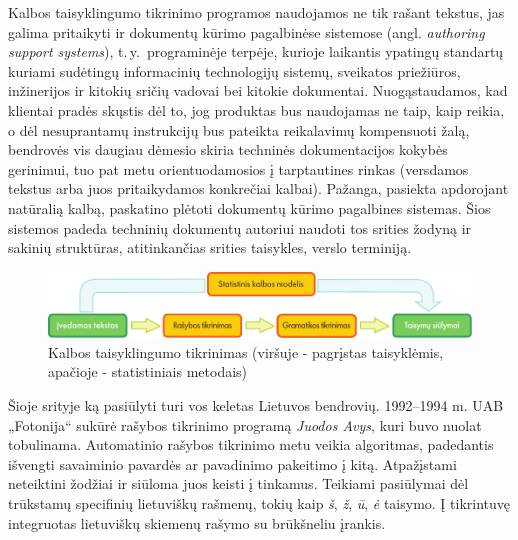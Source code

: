 \begin{multicols}{2}

Kalbos taisyklingumo tikrinimo programos naudojamos ne tik rašant tekstus, jas galima pritaikyti ir dokumentų kūrimo pagalbinėse sistemose (angl. \textit{authoring support systems}), t.\,y.~programinėje terpėje, kurioje laikantis ypatingų standartų kuriami sudėtingų informacinių technologijų sistemų, sveikatos priežiūros, inžinerijos ir kitokių sričių vadovai bei kitokie dokumentai. Nuogąstaudamos, kad klientai pradės skųstis dėl to, jog produktas bus naudojamas ne taip, kaip reikia, o dėl nesuprantamų instrukcijų bus pateikta reikalavimų kompensuoti žalą, bendrovės vis daugiau dėmesio skiria techninės dokumentacijos kokybės gerinimui, tuo pat metu orientuodamosios į tarptautines rinkas (versdamos tekstus arba juos pritaikydamos konkrečiai kalbai). Pažanga, pasiekta apdorojant natūralią kalbą, paskatino plėtoti dokumentų kūrimo pagalbines sistemas. Šios sistemos padeda techninių dokumentų autoriui naudoti tos srities žodyną ir sakinių struktūras, atitinkančias srities taisykles, verslo terminiją.

\begin{figure}[htb]
  \center
  \includegraphics[width=\textwidth]{../_media/lithuanian/language_checking}
  \caption{Kalbos taisyklingumo tikrinimas (viršuje - pagrįstas taisyklėmis, apačioje - statistiniais metodais)} %
  \label{fig:langcheckingaarch_de}
\end{figure}

Šioje srityje ką pasiūlyti turi vos keletas Lietuvos bendrovių. 1992–1994 m. UAB „Fotonija“ sukūrė rašybos tikrinimo programą \textit{Juodos Avys}, kuri buvo nuolat tobulinama. Automatinio rašybos tikrinimo metu veikia algoritmas, padedantis išvengti savaiminio pavardės ar pavadinimo pakeitimo į kitą. Atpažįstami neteiktini žodžiai ir siūloma juos keisti į tinkamus. Teikiami pasiūlymai dėl trūkstamų specifinių lietuviškų rašmenų, tokių kaip \textit{š}, \textit{ž},  \textit{ū}, \textit{ė} taisymo. Į tikrintuvę integruotas lietuviškų skiemenų rašymo su brūkšneliu įrankis.   


\end{multicols}
